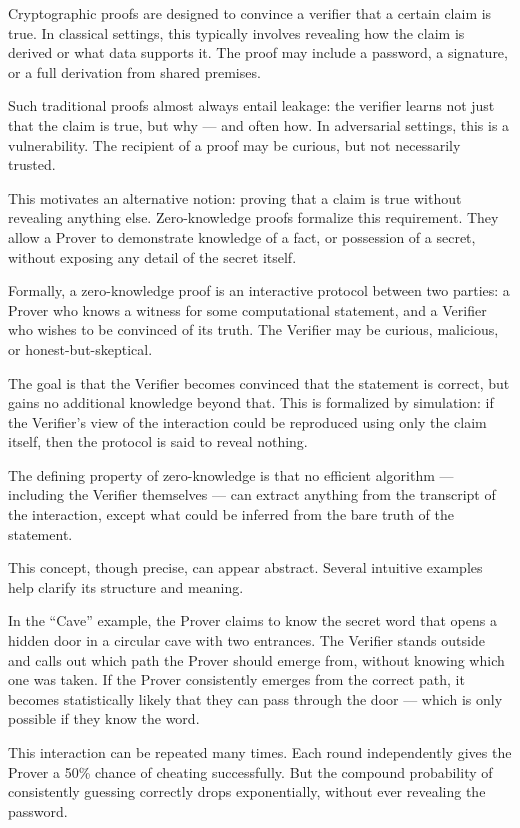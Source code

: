 
Cryptographic proofs are designed to convince a verifier that a certain claim is true. In classical settings, this typically involves revealing how the claim is derived or what data supports it. The proof may include a password, a signature, or a full derivation from shared premises.

Such traditional proofs almost always entail leakage: the verifier learns not just that the claim is true, but why — and often how. In adversarial settings, this is a vulnerability. The recipient of a proof may be curious, but not necessarily trusted.

This motivates an alternative notion: proving that a claim is true without revealing anything else. Zero-knowledge proofs formalize this requirement. They allow a Prover to demonstrate knowledge of a fact, or possession of a secret, without exposing any detail of the secret itself.

Formally, a zero-knowledge proof is an interactive protocol between two parties: a Prover who knows a witness for some computational statement, and a Verifier who wishes to be convinced of its truth. The Verifier may be curious, malicious, or honest-but-skeptical.

The goal is that the Verifier becomes convinced that the statement is correct, but gains no additional knowledge beyond that. This is formalized by simulation: if the Verifier's view of the interaction could be reproduced using only the claim itself, then the protocol is said to reveal nothing.

The defining property of zero-knowledge is that no efficient algorithm — including the Verifier themselves — can extract anything from the transcript of the interaction, except what could be inferred from the bare truth of the statement.

This concept, though precise, can appear abstract. Several intuitive examples help clarify its structure and meaning.

In the “Cave” example, the Prover claims to know the secret word that opens a hidden door in a circular cave with two entrances. The Verifier stands outside and calls out which path the Prover should emerge from, without knowing which one was taken. If the Prover consistently emerges from the correct path, it becomes statistically likely that they can pass through the door — which is only possible if they know the word.

This interaction can be repeated many times. Each round independently gives the Prover a 50\% chance of cheating successfully. But the compound probability of consistently guessing correctly drops exponentially, without ever revealing the password.

